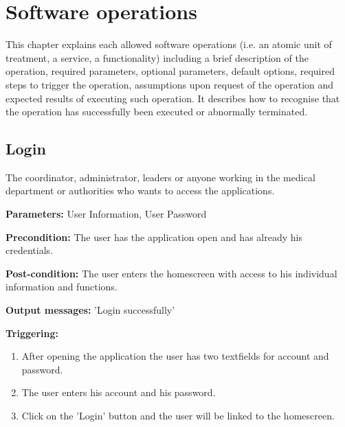 \chapter{Software operations}
\label{chap:soptware_operations}


This chapter explains each allowed software operations (i.e. an atomic
unit of treatment, a service, a functionality) including a brief description of 
the operation, required parameters, optional parameters, default options, 
required steps to trigger the operation, assumptions upon request of the
operation  and expected results of executing such operation.
It describes how to recognise that the operation has successfully been executed
or abnormally terminated. 

\section{Login}
\label{operation:Login}
The coordinator, administrator, leaders or anyone working in the medical
department or authorities who wants to access the applications.\\
\begin{description}
\item \textbf{Parameters:} User Information, User Password
\item \textbf{Precondition:} The user has the application open and has already
his credentials.
\item \textbf{Post-condition:}  The user enters the homescreen with access to
his individual information and functions.
\item \textbf{Output messages:} 'Login successfully'
\item \textbf{Triggering:}
\begin{enumerate}
\item After opening the application the user has two textfields for account and
password.
\item The user enters his account and his password.
\item Click on the 'Login' button and the user will be linked to the homescreen.
\end{enumerate}
\end{description}

